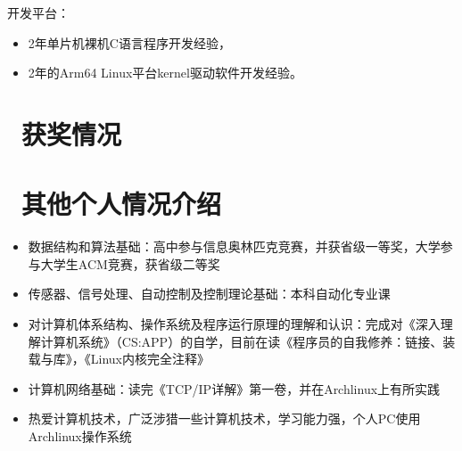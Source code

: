 \documentclass{resume}
\begin{document}
开发平台：
\begin{itemize}        
  \item 2年单片机裸机C语言程序开发经验，
  \item 2年的Arm64 Linux平台kernel驱动软件开发经验。
\end{itemize}

\hspace*{\fill}
\section{\faHeartO\ 获奖情况}

\hspace*{\fill}
\section{\faInfo\ 其他个人情况介绍}
\begin{itemize}[parsep=0.5ex]
\item 数据结构和算法基础：高中参与信息奥林匹克竞赛，并获省级一等奖，大学参与大学生ACM竞赛，获省级二等奖
\item 传感器、信号处理、自动控制及控制理论基础：本科自动化专业课
\item 对计算机体系结构、操作系统及程序运行原理的理解和认识：完成对《深入理解计算机系统》（CS:APP）的自学，目前在读《程序员的自我修养：链接、装载与库》，《Linux内核完全注释》
\item 计算机网络基础：读完《TCP/IP详解》第一卷，并在Archlinux上有所实践
\item 热爱计算机技术，广泛涉猎一些计算机技术，学习能力强，个人PC使用Archlinux操作系统
\end{itemize}

%
%
\end{document}
